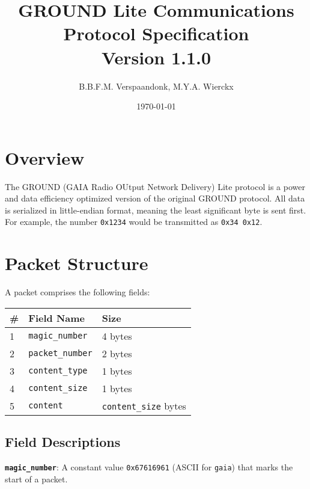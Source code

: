 \documentclass[a4paper]{article}
\title{GROUND Lite Communications Protocol Specification\\ \large Version 1.1.0}
\date{\today}
\author{B.B.F.M. Verspaandonk, M.Y.A. Wierckx}
\begin{document}
\maketitle

\tableofcontents

\section{Overview}
The GROUND (GAIA Radio OUtput Network Delivery) Lite protocol is a power and data efficiency optimized version of the original GROUND protocol. All data is serialized in little-endian format, meaning the least significant byte is sent first. For example, the number \texttt{0x1234} would be transmitted as \texttt{0x34 0x12}.

\section{Packet Structure}
A packet comprises the following fields:
\begin{longtable}{@{}lll@{}}
\toprule
\# & Field Name             & Size                         \\
\midrule
1  & \texttt{magic\_number} & 4 bytes                      \\
2  & \texttt{packet\_number}& 2 bytes                      \\
3  & \texttt{content\_type} & 1 bytes                      \\
4  & \texttt{content\_size} & 1 bytes                      \\
5  & \texttt{content}       & \texttt{content\_size} bytes \\
\bottomrule
\end{longtable}

\subsection{Field Descriptions}
\textbf{\texttt{magic\_number}}: A constant value \texttt{0x67616961} (ASCII for \texttt{gaia}) that marks the start of a packet.
\end{document}
